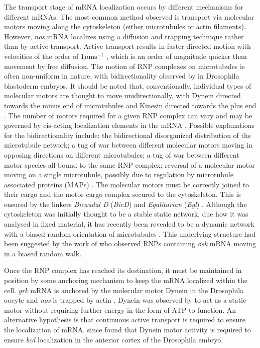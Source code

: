 \documentclass[twocolumn]{biophys}
\begin{document}
The transport stage of mRNA localization occurs by different mechanisms for different mRNAs.
The most common method observed is transport via molecular motors moving along the cytoskeleton (either microtubules or actin filaments). 
However, \textit{nos} mRNA localizes using a diffusion and trapping technique \citep{forrest2003live} rather than by active transport. 
Active transport results in faster directed motion with velocities of the order of $1 \mu \text{m} \text{s}^{-1}$ \citep{weil2006localization, zimyanin2008vivo}, which is an order of magnitude quicker than movement by free diffusion.
The motion of RNP complexes on microtubules is often non-uniform in nature, with bidirectionality observed by \citet{vendra2007dynactin} in Drosophila blastoderm embryos.
It should be noted that, conventionally, individual types of molecular motors are thought to move unidirectionally, with Dynein directed towards the minus end of microtubules and Kinesin directed towards the plus end \citep{howard2001mechanics}.
The number of motors required for a given RNP complex can vary and may be governed by cis-acting localization elements in the mRNA \citep{amrute2012single}.
Possible explanations for the bidirectionality include: the bidirectional disorganized distribution of the microtubule network; a tug of war between different molecular motors moving in opposing directions on different microtubules; a tug of war between different motor species all bound to the same RNP complex; reversal of a molecular motor moving on a single microtubule, possibly due to regulation by microtubule associated proteins (MAPs) \citep{buxbaum2015right}. 
The molecular motors must be correctly joined to their cargo and the motor cargo complex secured to the cytoskeleton.
This is ensured by the linkers \textit{Bicaudal D} (\textit{BicD}) and \textit{Egalitarian} (\textit{Egl}) \citep{parton2014subcellular}. 
Although the cytoskeleton was initially thought to be a stable static network, due how it was analysed in fixed material, it has recently been revealed to be a dynamic network with a biased random orientation of microtubules \citep{parton20111}.
This underlying structure had been suggested by the work of \citet{zimyanin2008vivo} who observed RNPs containing \textit{osk} mRNA moving in a biased random walk.  

Once the RNP complex has reached its destination, it must be maintained in position by some anchoring mechanism to keep the mRNA localized within the cell.
\textit{grk} mRNA is anchored by the molecular motor Dynein \citep{delanoue2005dynein} in the Drosophila oocyte and \textit{nos} is trapped by actin \citep{forrest2003live}.
Dynein was observed by \citet{delanoue2005dynein} to act as a static motor without requiring further energy in the form of ATP to function. 
An alternative hypothesis is that continuous active transport is required to ensure the localization of mRNA, since \citet{weil2006localization} found that Dynein motor activity is required to ensure \textit{bcd} localization in the anterior cortex of the Drosophila embryo.
\end{document}
